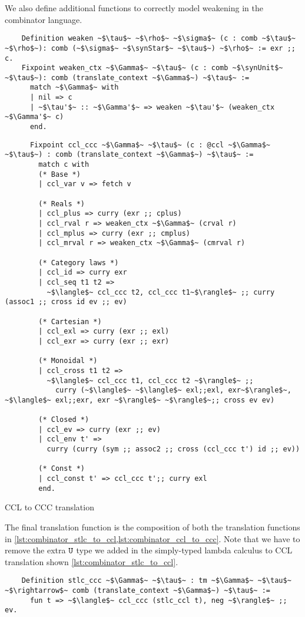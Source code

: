   We also define additional functions to correctly model weakening in the combinator language.

  \begin{verbatim}
    Definition weaken ~$\tau$~ ~$\rho$~ ~$\sigma$~ (c : comb ~$\tau$~ ~$\rho$~): comb (~$\sigma$~ ~$\synStar$~ ~$\tau$~) ~$\rho$~ := exr ;; c.
    Fixpoint weaken_ctx ~$\Gamma$~ ~$\tau$~ (c : comb ~$\synUnit$~ ~$\tau$~): comb (translate_context ~$\Gamma$~) ~$\tau$~ :=
      match ~$\Gamma$~ with
      | nil => c
      | ~$\tau'$~ :: ~$\Gamma'$~ => weaken ~$\tau'$~ (weaken_ctx ~$\Gamma'$~ c)
      end.
  \end{verbatim}

  \begin{listing}
    \begin{verbatim}
      Fixpoint ccl_ccc ~$\Gamma$~ ~$\tau$~ (c : @ccl ~$\Gamma$~ ~$\tau$~) : comb (translate_context ~$\Gamma$~) ~$\tau$~ :=
        match c with
        (* Base *)
        | ccl_var v => fetch v

        (* Reals *)
        | ccl_plus => curry (exr ;; cplus)
        | ccl_rval r => weaken_ctx ~$\Gamma$~ (crval r)
        | ccl_mplus => curry (exr ;; cmplus)
        | ccl_mrval r => weaken_ctx ~$\Gamma$~ (cmrval r)

        (* Category laws *)
        | ccl_id => curry exr
        | ccl_seq t1 t2 =>
          ~$\langle$~ ccl_ccc t2, ccl_ccc t1~$\rangle$~ ;; curry (assoc1 ;; cross id ev ;; ev)

        (* Cartesian *)
        | ccl_exl => curry (exr ;; exl)
        | ccl_exr => curry (exr ;; exr)

        (* Monoidal *)
        | ccl_cross t1 t2 =>
          ~$\langle$~ ccl_ccc t1, ccl_ccc t2 ~$\rangle$~ ;;
            curry (~$\langle$~ ~$\langle$~ exl;;exl, exr~$\rangle$~, ~$\langle$~ exl;;exr, exr ~$\rangle$~ ~$\rangle$~;; cross ev ev)

        (* Closed *)
        | ccl_ev => curry (exr ;; ev)
        | ccl_env t' =>
          curry (curry (sym ;; assoc2 ;; cross (ccl_ccc t') id ;; ev))

        (* Const *)
        | ccl_const t' => ccl_ccc t';; curry exl
        end.
    \end{verbatim}
    \caption{CCL to CCC translation}
    \label{lst:combinator_ccl_to_ccc}
  \end{listing}

  The final translation function is the composition of both the translation functions in \cref{lst:combinator_stlc_to_ccl,lst:combinator_ccl_to_ccc}.
  Note that we have to remove the extra $\texttt{U}$ type we added in the simply-typed lambda calculus to CCL translation shown \cref{lst:combinator_stlc_to_ccl}.

  \begin{verbatim}
    Definition stlc_ccc ~$\Gamma$~ ~$\tau$~ : tm ~$\Gamma$~ ~$\tau$~ ~$\rightarrow$~ comb (translate_context ~$\Gamma$~) ~$\tau$~ :=
      fun t => ~$\langle$~ ccl_ccc (stlc_ccl t), neg ~$\rangle$~ ;; ev.
  \end{verbatim}
